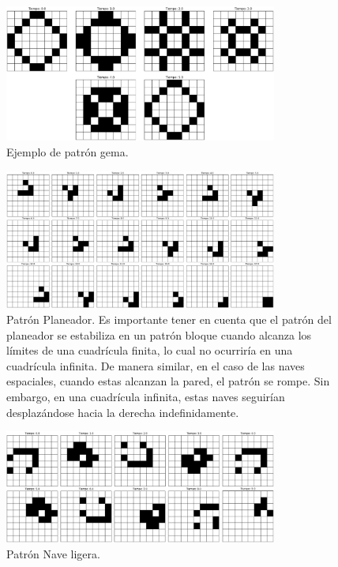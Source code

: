 \documentclass[12pt]{article}
\begin{document}
\begin{figure}
  \centering
  \includegraphics[width=0.8\textwidth]{imagenes/oscilante4.png}
  \caption{Ejemplo de patrón gema.\label{img:oscilante4}}
\end{figure}



\begin{figure}
  \centering
  \includegraphics[width=0.8\textwidth]{imagenes/nave1.png}
  \caption{Patrón Planeador. Es importante tener en cuenta que el patrón del planeador se estabiliza en un patrón bloque cuando alcanza los límites de una cuadrícula finita, lo cual no ocurriría en una cuadrícula infinita. De manera similar, en el caso de las naves espaciales, cuando estas alcanzan la pared, el patrón se rompe. Sin embargo, en una cuadrícula infinita, estas naves seguirían desplazándose hacia la derecha indefinidamente.\label{img:nave1}}
\end{figure}

\begin{figure}
  \centering
  \includegraphics[width=0.8\textwidth]{imagenes/nave2.png}
  \caption{Patrón Nave ligera.\label{img:nave2}}
\end{figure}
\end{document}
